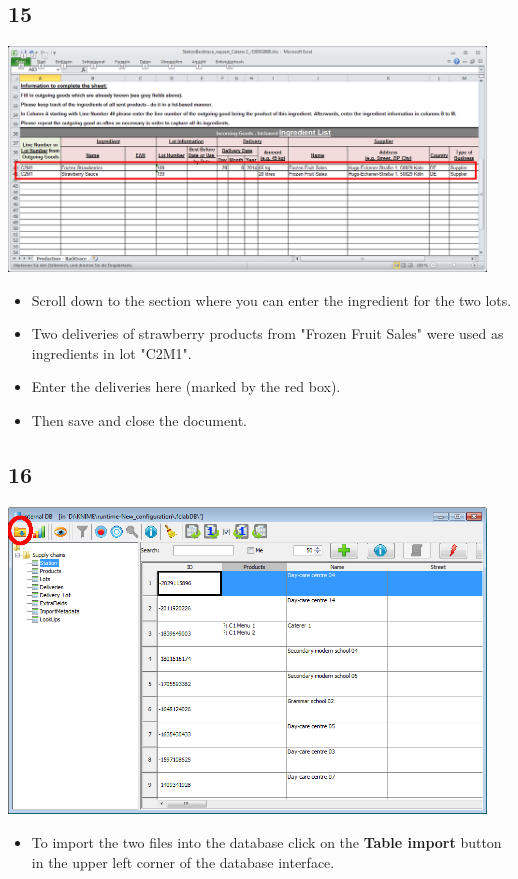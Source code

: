 \documentclass{beamer}
\begin{document}
\subsection{15}
\begin{frame}
	\begin{center}
 		\includegraphics[width=0.95\textwidth]{15.png}
	\end{center}
	\begin{itemize}
		\item Scroll down to the section where you can enter the ingredient for the two lots.
		\item Two deliveries of strawberry products from "Frozen Fruit Sales" were used as ingredients in lot "C2M1".
		\item Enter the deliveries here (marked by the red box).
		\item Then save and close the document.
	\end{itemize}
\end{frame}

\subsection{16}
\begin{frame}
	\begin{center}
  		\includegraphics[width=0.95\textwidth]{16.png}
	\end{center}
	\begin{itemize}
		\item To import the two files into the database click on the \textbf{Table import} button in the upper left corner of the database interface.
	\end{itemize}
\end{frame}
\end{document}
